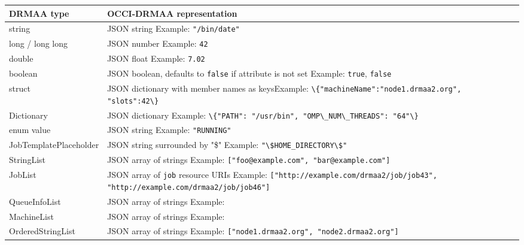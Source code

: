 \documentclass[10pt]{article}
\newcommand{\h}[1]{\lstinline|#1|}
\begin{document}
\begin{table}[ht]
\centering
\begin{tabularx}{\textwidth}{|l|>{\raggedright\arraybackslash}X|}
\hline
DRMAA type & OCCI-DRMAA representation\\
\hline
string                 & JSON string \linebreak Example: \h{"/bin/date"} \\
long / long long       & JSON number \linebreak Example: \h{42} \\
double                 & JSON float  \linebreak Example: \h{7.02} \\
boolean                & JSON boolean, defaults to \h{false} if attribute is not set \linebreak Example:  \h{true}, \h{false} \\
struct                 & JSON dictionary with member names as keys\linebreak Example:  \h{\{"machineName":"node1.drmaa2.org", "slots":42\}} \\
Dictionary             & JSON dictionary \linebreak Example:  \h{\{"PATH": "/usr/bin", "OMP\_NUM\_THREADS": "64"\}} \\
enum value             & JSON string \linebreak Example:  \h{"RUNNING"} \\
JobTemplatePlaceholder & JSON string surrounded by "\$" \linebreak Example: \h{"\$HOME_DIRECTORY\$"} \\ 
StringList           & JSON array of strings \linebreak Example:  \h{["foo@example.com", "bar@example.com"]} \\
JobList               & JSON array of \h{job} resource URIs \linebreak Example:  \h{["http://example.com/drmaa2/job/job43", "http://example.com/drmaa2/job/job46"]} \\
QueueInfoList      & JSON array of strings \linebreak Example:  \\
MachineList        & JSON array of strings \linebreak Example:  \\
OrderedStringList      & JSON array of strings \linebreak Example:  \h{["node1.drmaa2.org", "node2.drmaa2.org"]} \\

\end{tabularx}
\end{table}
\end{document}
